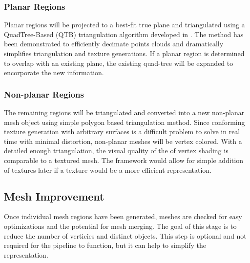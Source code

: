 \documentclass[english]{article}
\begin{document}
\subsubsection{Planar Regions}
Planar regions will be projected to a best-fit true plane and triangulated using a QuadTree-Based (QTB) triangulation algorithm developed in \cite{planesegmentationQTB}. The method has been demonstrated to efficiently decimate points clouds and dramatically simplifies triangulation and texture generations. If a planar region is determined to overlap with an existing plane, the existing quad-tree will be expanded to encorporate the new information.

\subsubsection{Non-planar Regions}
The remaining regions will be triangulated and converted into a new non-planar mesh object using simple polygon based triangulation method. Since conforming texture generation with arbitrary surfaces is a difficult problem to solve in real time with minimal distortion, non-planar meshes will be vertex colored. With a detailed enough triangulation, the visual quality of the of vertex shading is comparable to a textured mesh. The framework would allow for simple addition of textures later if a texture would be a more efficient representation.

\subsection{Mesh Improvement}
Once individual mesh regions have been generated, meshes are checked for easy optimizations and the potential for mesh merging. The goal of this stage is to reduce the number of verticies and distinct objects. This step is optional and not required for the pipeline to function, but it can help to simplify the representation.




\end{document}
